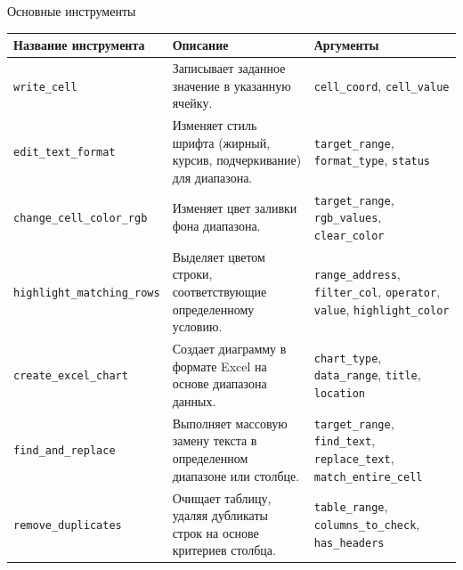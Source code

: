 \documentclass{beamer}
\begin{document}
\begin{frame}{Основные инструменты}
    \scriptsize
    \setlength{\tabcolsep}{3pt}
    \renewcommand{\arraystretch}{0.85}
    \centering
    \begin{tabular}{|p{}|p{}|p{}|}
        \hline
        \textbf{Название инструмента} & \textbf{Описание} & \textbf{Аргументы} \\
        \hline
        \texttt{write\_cell} & Записывает заданное значение в указанную ячейку. & \texttt{cell\_coord}, \texttt{cell\_value} \\
        \hline
        \texttt{edit\_text\_format} & Изменяет стиль шрифта (жирный, курсив, подчеркивание) для диапазона. & \texttt{target\_range}, \texttt{format\_type}, \texttt{status} \\
        \hline
        \texttt{change\_cell\_color\_rgb} & Изменяет цвет заливки фона диапазона. & \texttt{target\_range}, \texttt{rgb\_values}, \texttt{clear\_color} \\
        \hline
        \texttt{highlight\_matching\_rows} & Выделяет цветом строки, соответствующие определенному условию. & \texttt{range\_address}, \texttt{filter\_col}, \texttt{operator}, \texttt{value}, \texttt{highlight\_color} \\
        \hline
        \texttt{create\_excel\_chart} & Создает диаграмму в формате Excel на основе диапазона данных. & \texttt{chart\_type}, \texttt{data\_range}, \texttt{title}, \texttt{location} \\
        \hline
        \texttt{find\_and\_replace} & Выполняет массовую замену текста в определенном диапазоне или столбце. & \texttt{target\_range}, \texttt{find\_text}, \texttt{replace\_text}, \texttt{match\_entire\_cell} \\
        \hline
        \texttt{remove\_duplicates} & Очищает таблицу, удаляя дубликаты строк на основе критериев столбца. & \texttt{table\_range}, \texttt{columns\_to\_check}, \texttt{has\_headers} \\
        \hline
    \end{tabular}
\end{frame}
\end{document}
